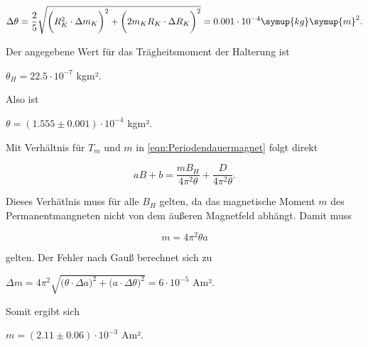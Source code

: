 \begin{equation}
  \Delta \theta = \frac{2}{5} \sqrt{ \bigg( R_K^2 \cdot \Delta m_K \bigg)^2 + \bigg( 2m_K R_K \cdot \Delta R_K \bigg)^2 } = 0.001 \cdot 10^{-4} \symup{kg} \symup{m}^2.
\end{equation}

Der angegebene Wert für das Trägheitsmoment der Halterung ist

\vspace{.5em}
\centerline{$\theta_H = 22.5 \cdot 10^{-7}$ kgm².}
\vspace{.5em}

Also ist

\vspace{.5em}
\centerline{$\theta = (1.555 \pm 0.001) \cdot 10^{-4}$ kgm².}
\vspace{.5em}

Mit Verhältnis für $T_m$ und $m$ in \eqref{eqn:Periodendauermagnet} folgt direkt

\begin{equation}
  aB + b = \frac{mB_H}{4 \pi^2 \theta} + \frac{D}{4 \pi^2 \theta}.
\end{equation}

Dieses Verhätlnis muss für alle $B_H$ gelten, da das magnetische Moment $m$ des Permanentmangneten nicht von dem äußeren Magnetfeld abhängt.
Damit muss

\begin{equation}
  m = 4 \pi^2 \theta a
\end{equation}

gelten. Der Fehler nach Gauß berechnet sich zu

\vspace{.5em}
\centerline{$\Delta m = 4 \pi^2 \sqrt{ \bigg( \theta \cdot \Delta a \bigg)^2 + \bigg( a \cdot \Delta \theta \bigg)^2 } = 6 \cdot 10^{-5}$ Am².}
\vspace{.5em}

Somit ergibt sich

\vspace{.5em}
\centerline{$m = (2.11 \pm 0.06) \cdot 10^{-3}$ Am².}
\vspace{.5em}